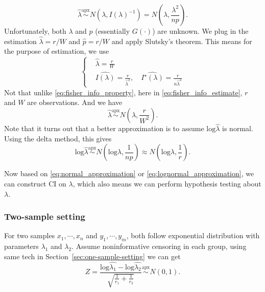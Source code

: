 \documentclass[a4paper,12pt]{article}
\begin{document}
\[
  \hat{\lambda}
  \overset{\mathrm{apx}}{\sim}
  N\left(\lambda, I\left(\lambda\right)^{-1}\right)
  = N\left(\lambda, \frac{\lambda^2}{np}\right)
  .
\]
Unfortunately, both $\lambda$ and $p$ (essentially $G\left(\cdot\right)$) are unknown. We plug in the estimation $\hat{\lambda} = r / W$ and $\hat{p} = r / W$ and apply Slutsky's theorem. This means for the purpose of estimation, we use
\begin{equation}
  \label{eq:fisher_info_estimate}
  \left\{
    \begin{aligned}
      & \hat{\lambda} = \frac{r}{W}    \\
      & \hat{I\left(\lambda\right)} = \frac{r}{\hat{\lambda}^2}
      ,\quad
      \hat{I^\star\left(\lambda\right)} = \frac{r}{n\hat{\lambda}^2}
    \end{aligned}
  \right.
\end{equation}
Not that unlike \eqref{eq:fisher_info_property}, here in \eqref{eq:fisher_info_estimate}, $r$ and $W$ are observations. And we have
\begin{equation}
  \label{eq:normal_approximation}
    \hat{\lambda} \overset{\mathrm{apx}}{\sim}
  N\left(\lambda, \frac{r}{W^2}\right)
  .
\end{equation}
Note that it turns out that a better approximation is to assume $\mathrm{log}\hat{\lambda}$ is normal. Using the delta method, this gives
\begin{equation}
  \label{eq:lognormal_approximation}
    \mathrm{log}\hat{\lambda}
  \overset{\mathrm{apx}}{\sim}
  N\left(
    \mathrm{log}\lambda,
    \frac{1}{np}
  \right)
  \approx
  N\left(\mathrm{log}\lambda, \frac{1}{r}\right)
  .
\end{equation}
\par
Now based on \eqref{eq:normal_approximation} or \eqref{eq:lognormal_approximation}, we can construct CI on $\lambda$, which also means we can perform hypothesis testing about $\lambda$.

\subsubsection{Two-sample setting}
\label{sec:two-sample-setting}

For two samples $x_1, \cdots, x_n$ and $y_1, \cdots, y_m$, both follow exponential distribution with parameters $\lambda_1$ and $\lambda_2$. Assume noninformative censoring in each group, using same tech in Section~\ref{sec:one-sample-setting} we can get
\[
  Z = \frac{
    \mathrm{log}\hat{\lambda_1} - \mathrm{log}\hat{\lambda_2}
  }{
    \sqrt{\frac{1}{r_1} + \frac{1}{r_2}}
  }
  \overset{\mathrm{apx}}{\sim}
  N\left(0, 1\right)
  .
\]
\end{document}
